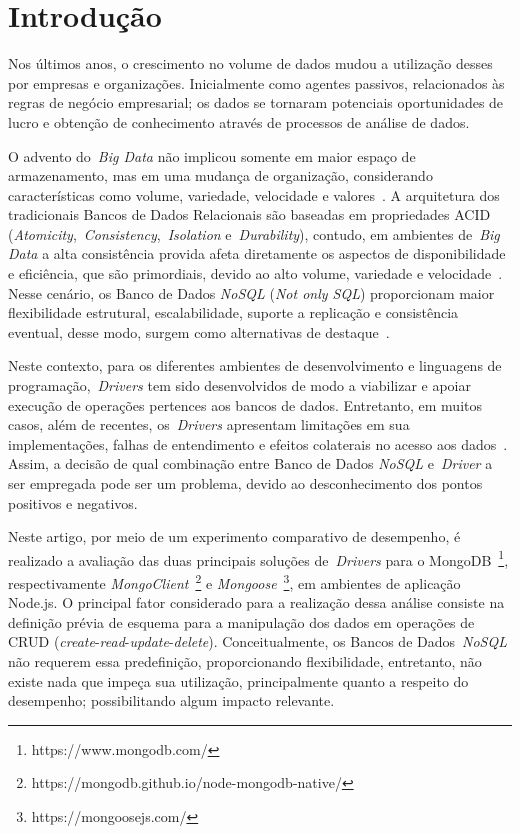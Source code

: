 \documentclass{svproc}
\begin{document}
\section{Introdução}
\label{sec:introducao}

Nos últimos anos, o crescimento no volume de dados mudou a utilização desses por empresas e organizações. Inicialmente como agentes passivos, relacionados às regras de negócio empresarial; os dados se tornaram potenciais oportunidades de lucro e obtenção de conhecimento através de processos de análise de dados.

O advento do~\emph{Big Data} não implicou somente em maior espaço de armazenamento, mas em uma mudança de organização, considerando características como volume, variedade, velocidade e valores~\cite{ward2013undefined}. 
A arquitetura dos tradicionais Bancos de Dados Relacionais são baseadas em propriedades ACID (\textit{Atomicity},~\textit{Consistency},~\textit{Isolation} e~\textit{Durability}), contudo, em ambientes de~\emph{Big Data} a alta consistência provida afeta diretamente os aspectos de disponibilidade e eficiência, que são primordiais, devido ao alto volume, variedade e velocidade~\cite{aparicio:2016}. 
Nesse cenário, os Banco de Dados \textit{NoSQL} (\emph{Not only SQL}) proporcionam maior flexibilidade estrutural, escalabilidade, suporte a replicação e consistência eventual, desse modo, surgem como alternativas de destaque~\cite{han2011survey}. 
  
Neste contexto, para os diferentes ambientes de desenvolvimento e linguagens de programação,~\emph{Drivers} tem sido desenvolvidos de modo a viabilizar e apoiar execução de operações pertences aos bancos de dados. Entretanto, em muitos casos, além de recentes, os~\emph{Drivers} apresentam limitações em sua implementações, falhas de entendimento e efeitos colaterais no acesso aos dados~\cite{rafique:2018}. 
Assim, a decisão de qual combinação entre Banco de Dados \textit{NoSQL} e~\emph{Driver} a ser empregada pode ser um problema, devido ao desconhecimento dos pontos positivos e negativos.

Neste artigo, por meio de um experimento comparativo de desempenho, é realizado a avaliação das duas principais soluções de~\emph{Drivers} para o MongoDB~\footnote{https://www.mongodb.com/}, respectivamente \emph{MongoClient}~\footnote{https://mongodb.github.io/node-mongodb-native/} e \emph{Mongoose}~\footnote{https://mongoosejs.com/}, em ambientes de aplicação Node.js. 
O principal fator considerado para a realização dessa análise consiste na definição prévia de esquema para a manipulação dos dados em operações de CRUD (\emph{create}-\emph{read}-\emph{update}-\emph{delete}). Conceitualmente, os Bancos de Dados~\textit{NoSQL} não requerem essa predefinição, proporcionando flexibilidade, entretanto, não existe nada que impeça sua utilização, principalmente quanto a respeito do desempenho; possibilitando algum impacto relevante.
\end{document}
